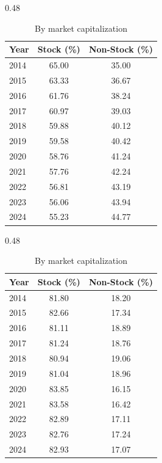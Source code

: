 \documentclass[fleqn]{rbfin}
\begin{document}
\begin{table}[!htbp]
    \captionsetup{labelfont=normalfont, textfont=normalfont, justification=justified, singlelinecheck=off}
    \captionsetup[subtable]{labelfont=normalfont, textfont=normalfont, justification=centering, singlelinecheck=off}
    
    \centering
    
    \begin{subtable}[t]{0.48\textwidth}
        \centering
        \begin{tabular}{lcc}
        \toprule
        Year & Stock (\%) & Non-Stock (\%) \\
        \midrule
        2014 & 65.00 & 35.00 \\
        2015 & 63.33 & 36.67 \\
        2016 & 61.76 & 38.24 \\
        2017 & 60.97 & 39.03 \\
        2018 & 59.88 & 40.12 \\
        2019 & 59.58 & 40.42 \\
        2020 & 58.76 & 41.24 \\
        2021 & 57.76 & 42.24 \\
        2022 & 56.81 & 43.19 \\
        2023 & 56.06 & 43.94 \\
        2024 & 55.23 & 44.77 \\
        \bottomrule
        \end{tabular}
        \caption{By total quantity}
        \label{tab:global_count}
    \end{subtable}%
    \hfill%
    \begin{subtable}[t]{0.48\textwidth}
        \centering
        \begin{tabular}{lcc}
        \toprule
        Year & Stock (\%) & Non-Stock (\%) \\
        \midrule
        2014 & 81.80 & 18.20 \\
        2015 & 82.66 & 17.34 \\
        2016 & 81.11 & 18.89 \\
        2017 & 81.24 & 18.76 \\
        2018 & 80.94 & 19.06 \\
        2019 & 81.04 & 18.96 \\
        2020 & 83.85 & 16.15 \\
        2021 & 83.58 & 16.42 \\
        2022 & 82.89 & 17.11 \\
        2023 & 82.76 & 17.24 \\
        2024 & 82.93 & 17.07 \\
        \bottomrule
        \end{tabular}
        \caption{By market capitalization}
        \label{tab:global_mcap}
    \end{subtable}
    

\end{table}
\end{document}

